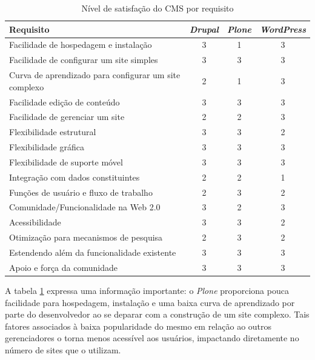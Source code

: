 \newpage

\begin{table}[h]
\centering
{}
\caption{Nível de satisfação do CMS por requisito}
\vspace{0.5cm}
\begin{tabular}{l|c|c|c}
 
\textbf{Requisito} & \textbf{\textit{Drupal}} & \textbf{\textit{Plone}} & \textbf{\textit{WordPress}} \\ %
\hline                               %
Facilidade de hospedagem e instalação & 3 & 1 & 3 \\
Facilidade de configurar um site simples & 3 & 3 & 3 \\
Curva de aprendizado para configurar um site complexo & 2 & 1 & 3 \\
Facilidade edição de conteúdo & 3 & 3 & 3 \\
Facilidade de gerenciar um site & 2 & 2 & 3 \\
Flexibilidade estrutural & 3 & 3 & 2 \\
Flexibilidade gráfica & 3 & 3 & 3 \\
Flexibilidade de suporte móvel & 3 & 3 & 3 \\
Integração com dados constituintes & 2 & 2 & 1 \\
Funções de usuário e fluxo de trabalho & 2 & 3 & 2 \\
Comunidade/Funcionalidade na Web 2.0 & 3 & 2 & 3 \\
Acessibilidade & 3 & 3 & 2 \\
Otimização para mecanismos de pesquisa & 2 & 3 & 2 \\
Estendendo além da funcionalidade existente & 3 & 3 & 3 \\
Apoio e força da comunidade & 3 & 3 & 3 \\
\hline   
\end{tabular}
\label{nivel-cms}
\end{table}


A tabela \ref{nivel-cms} expressa uma informação importante: o \textit{Plone} proporciona pouca facilidade para hospedagem, instalação e uma baixa curva de aprendizado por parte do desenvolvedor ao se deparar com a construção de um site complexo. Tais fatores associados à baixa popularidade do mesmo em relação ao outros gerenciadores o torna menos acessível aos usuários, impactando diretamente no número de sites que o utilizam.

